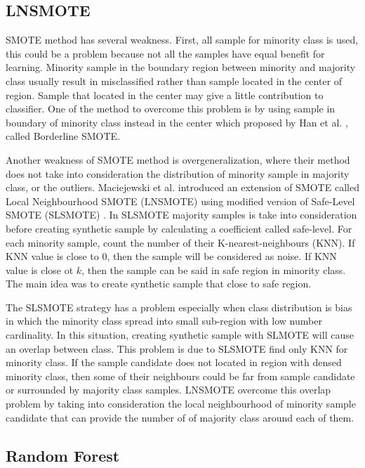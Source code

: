 \documentclass[conference,compsoc,a4paper,twocolumn,final]{IEEEtran}
\begin{document}
\subsection{LNSMOTE}
\label{subsection:lnsmote}

SMOTE method has several weakness.
First, all sample for minority class is used, this could be a problem because
not all the samples have equal benefit for learning.
Minority sample in the boundary region between minority and majority class
usually result in misclassified rather than sample located in the center of
region.
Sample that located in the center may give a little contribution to classifier.
One of the method to overcome this problem is by using sample in boundary of
minority class instead in the center which proposed by Han et al.
\cite{han2005borderline}, called Borderline SMOTE.

Another weakness of SMOTE method is overgeneralization, where their method does
not take into consideration the distribution of minority sample in majority
class, or the outliers.
Maciejewski et al. introduced an extension of SMOTE called Local Neighbourhood
SMOTE (LNSMOTE) \cite{maciejewski2011local}
using modified version of Safe-Level SMOTE (SLSMOTE)
\cite{bunkhumpornpat2009safe}.
In SLSMOTE majority samples is take into consideration before creating
synthetic sample by calculating a coefficient called safe-level.
For each minority sample, count the number of their K-nearest-neighbours (KNN).
If KNN value is close to 0, then the sample will be considered as noise.
If KNN value is close ot $k$, then the sample can be said in safe region in
minority class.
The main idea was to create synthetic sample that close to safe region.

The SLSMOTE strategy has a problem especially when class distribution is bias
in which the minority class spread into small sub-region with low number
cardinality.
In this situation, creating synthetic sample with SLMOTE will cause an overlap
between class.
This problem is due to SLSMOTE find only KNN for minority class.
If the sample candidate does not located in region with densed minority class,
then some of their neighbours could be far from sample candidate or surrounded
by majority class samples.
LNSMOTE overcome this overlap problem by taking into consideration the local
neighbourhood of minority sample candidate that can provide the number of of
majority class around each of them.

\subsection{Random Forest}
\label{subsection:rf}
\end{document}
